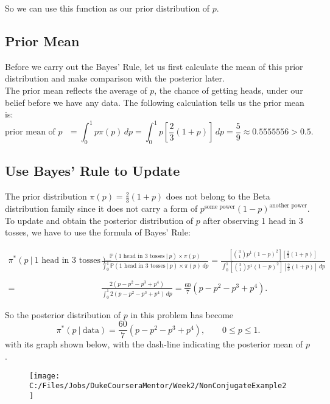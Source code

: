 \documentclass{article}
\def\dsst{\displaystyle}
\begin{document}
So we can use this function as our prior distribution of $p$.

\subsection*{Prior Mean}

Before we carry out the Bayes' Rule, let us first calculate the mean of this prior distribution and make comparison with the posterior later. \\

The prior mean reflects the average of $p$, the chance of getting heads, under our belief before we have any data. The following calculation tells us the prior mean is:
$$ \text{prior mean of $p$ }=\int_0^1 p\pi(p)\, dp = \int_0^1 p\left[\frac{2}{3}(1+p)\right]\, dp = \frac{5}{9}\approx 0.5555556 > 0.5.$$

\subsection*{Use Bayes' Rule to Update}

The prior distribution $\dsst \pi(p) = \frac{2}{3}(1+p)$ does not belong to the Beta distribution family since it does not carry a form of $p^{\text{some power}}(1-p)^{\text{another power}}$. To update and obtain the posterior distribution of $p$ after observing 1 head in 3 tosses, we have to use the formula of Bayes' Rule:

\begin{align*}
\pi^*(p~|~\text{1 head in 3 tosses}) = & \frac{\mathbb{P}(\text{1 head in 3 tosses}~|~p)\times \pi(p)}{\dsst \int_{0}^{1}\mathbb{P}(\text{1 head in 3 tosses}~|~p)\times \pi(p)\, dp} = \frac{\dsst \left[\binom{3}{1}p^1(1-p)^2\right]\left[\frac{2}{3}(1+p)\right]}{\dsst \int_0^1  \left[\binom{3}{1}p^1(1-p)^2\right]\left[\frac{2}{3}(1+p)\right]\, dp} \\
& \\
= & \frac{2(p-p^2-p^3+p^4)}{\dsst \int_0^1 2(p-p^2-p^3+p^4)\, dp} = \frac{60}{7}(p-p^2-p^3+p^4).
\end{align*}

So the posterior distribution of $p$ in this problem has become 
$$ \pi^*(p~|~\text{data}) = \frac{60}{7}(p-p^2-p^3+p^4),\qquad 0\leq p\leq 1. $$
with its graph shown below, with the dash-line indicating the posterior mean of $p$.
\begin{figure}[tbph]
	\centering
	\texttt{[image: C:/Files/Jobs/DukeCourseraMentor/Week2/NonConjugateExample2]}
	\label{fig:nonconjugateexample2}
\end{figure}
\end{document}
